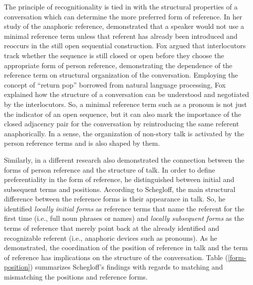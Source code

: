 \documentclass[12pt, draft]{article}
\begin{document}
The principle of recognitionality is tied in with the structural properties of a conversation which can determine the more preferred form of reference. In her study of the anaphoric reference, \textcite{fox1987} demonstrated that a speaker would not use a minimal reference term unless that referent has already been introduced and reoccurs in the still open sequential construction. Fox argued that interlocutors track whether the sequence is still closed or open before they choose the appropriate form of person reference, demonstrating the dependence of the reference term on structural organization of the conversation. Employing the concept of ``return pop'' borrowed from natural language processing, Fox explained how the structure of a conversation can be understood and negotiated by the interlocutors. So, a minimal reference term such as a pronoun is not just the indicator of an open sequence, but it can also mark the importance of the closed adjacency pair for the conversation by reintroducing the same referent anaphorically. In a sense, the organization of non-story talk is activated by the person reference terms and is also shaped by them.   

Similarly, in a different research \textcite{schegloff1996b} also demonstrated the connection between the forms of person reference and the structure of talk. In order to define preferentiality in the form of reference, he distinguished between initial and subsequent terms and positions. According to Schegloff, the main structural difference between the reference forms is their appearance in talk. So, he identified \textit{locally initial forms} as reference terms that name the referent for the first time (i.e., full noun phrases or names) and\textit{ locally subsequent forms} as the terms of reference that merely point back at the already identified and recognizable referent (i.e., anaphoric devices such as pronouns). As he demonstrated, the coordination of the position of reference in talk and the term of reference has implications on the structure of the conversation. Table (\ref{form-position}) summarizes Schegloff's findings with regards to matching and mismatching the positions and reference forms.
\end{document}
